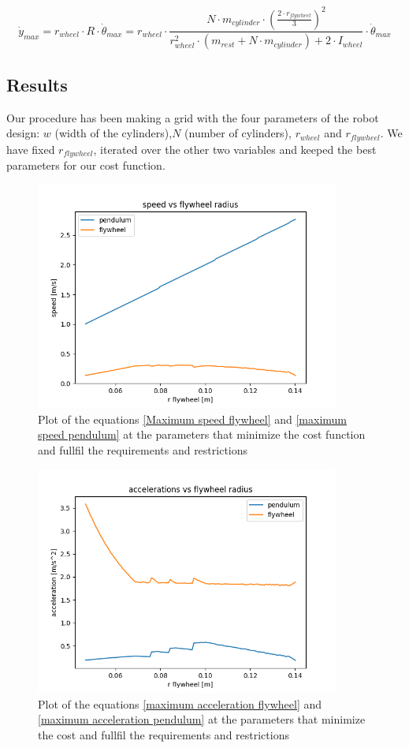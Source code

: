 \begin{equation*}
	\dot{y}_{max} = r_{wheel} \cdot  R \cdot  \dot{\theta}_{max} =r_{wheel} \cdot  \frac{ N \cdot  m_{cylinder} \cdot  (\frac{2\cdot r_{flywheel}}{3})^2}
    {r_{wheel}^2\cdot (m_{rest} + N \cdot m_{cylinder}) +  2\cdot I_{wheel}} \cdot  \dot{\theta}_{max}
\end{equation*}

\subsection{Results}
Our procedure has been making a grid with the four parameters of the robot 
design: $w$ (width of the cylinders),$N$ (number of cylinders), $r_{wheel}$ and $r_{flywheel}$.
We have fixed $r_{flywheel}$, iterated over the other two variables and keeped the best parameters for our cost function.


\begin{figure}[H]
	\centering
	\includegraphics[width=10cm]{img/optimization/speed.png}
	\caption{Plot of the equations \ref{Maximum speed flywheel} and \ref{maximum speed pendulum} at the parameters that minimize the cost function and fullfil the requirements and restrictions}
	\label{fig:Speed plot}
\end{figure}

\begin{figure}[H]
	\centering
	\includegraphics[width=10cm]{img/optimization/acceleration.png}
	\caption{Plot of the equations \ref{maximum acceleration flywheel} and \ref{maximum acceleration pendulum} at the parameters that minimize the cost and fullfil the requirements and restrictions}
	\label{fig:Speed plot}
\end{figure}

